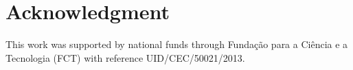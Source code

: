 \documentclass[journal]{IEEEtran}
\begin{document}



%





\section*{Acknowledgment}
This work was supported by national funds
through Funda\c c\~ao para a Ci\^encia e a Tecnologia (FCT) with
reference UID/CEC/50021/2013.
\end{document}
